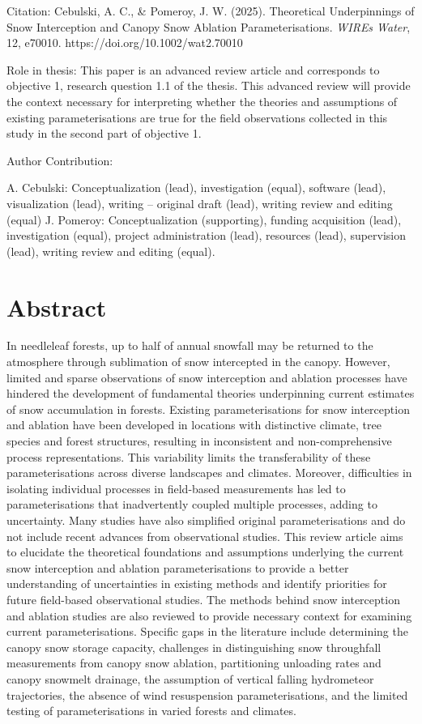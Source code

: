 \documentclass[
  letterpaper,
]{tex/uofsthesis-cs}
\begin{document}
Citation: Cebulski, A. C., \& Pomeroy, J. W. (2025). Theoretical
Underpinnings of Snow Interception and Canopy Snow Ablation
Parameterisations. \emph{WIREs Water}, 12, e70010.
https://doi.org/10.1002/wat2.70010

Role in thesis: This paper is an advanced review article and corresponds
to objective 1, research question 1.1 of the thesis. This advanced
review will provide the context necessary for interpreting whether the
theories and assumptions of existing parameterisations are true for the
field observations collected in this study in the second part of
objective 1.

Author Contribution:

A. Cebulski: Conceptualization (lead), investigation (equal), software
(lead), visualization (lead), writing -- original draft (lead), writing
review and editing (equal) J. Pomeroy: Conceptualization (supporting),
funding acquisition (lead), investigation (equal), project
administration (lead), resources (lead), supervision (lead), writing
review and editing (equal).

\section{Abstract}\label{abstract}

In needleleaf forests, up to half of annual snowfall may be returned to
the atmosphere through sublimation of snow intercepted in the canopy.
However, limited and sparse observations of snow interception and
ablation processes have hindered the development of fundamental theories
underpinning current estimates of snow accumulation in forests. Existing
parameterisations for snow interception and ablation have been developed
in locations with distinctive climate, tree species and forest
structures, resulting in inconsistent and non-comprehensive process
representations. This variability limits the transferability of these
parameterisations across diverse landscapes and climates. Moreover,
difficulties in isolating individual processes in field-based
measurements has led to parameterisations that inadvertently coupled
multiple processes, adding to uncertainty. Many studies have also
simplified original parameterisations and do not include recent advances
from observational studies. This review article aims to elucidate the
theoretical foundations and assumptions underlying the current snow
interception and ablation parameterisations to provide a better
understanding of uncertainties in existing methods and identify
priorities for future field-based observational studies. The methods
behind snow interception and ablation studies are also reviewed to
provide necessary context for examining current parameterisations.
Specific gaps in the literature include determining the canopy snow
storage capacity, challenges in distinguishing snow throughfall
measurements from canopy snow ablation, partitioning unloading rates and
canopy snowmelt drainage, the assumption of vertical falling hydrometeor
trajectories, the absence of wind resuspension parameterisations, and
the limited testing of parameterisations in varied forests and climates.
\end{document}
